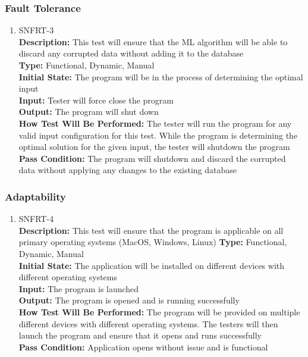\documentclass[12pt, titlepage]{article}
\begin{document}
\subsubsection{Fault Tolerance}
\begin{enumerate}
    \item{SNFRT-3\\}
    \textbf{Description:} This test will ensure that the ML algorithm will be able to discard any corrupted data without adding it to the database\\
    \textbf{Type:} Functional, Dynamic, Manual\\
    \textbf{Initial State:} The program will be in the process of determining the optimal input\\
    \textbf{Input:} Tester will force close the program\\
    \textbf{Output:} The program will shut down\\
    \textbf{How Test Will Be Performed:} The tester will run the program for any valid input configuration for this test. While the program is determining the optimal solution for the given input, the tester will shutdown the program\\
    \textbf{Pass Condition:} The program will shutdown and discard the corrupted data without applying any changes to the existing database\\
\end{enumerate}

\subsubsection{Adaptability}
\begin{enumerate}
    \item{SNFRT-4\\}
    \textbf{Description:} This test will ensure that the program is applicable on all primary operating systems (MacOS, Windows, Linux)
    \textbf{Type:} Functional, Dynamic, Manual\\
    \textbf{Initial State:} The application will be installed on different devices with different operating systems\\
    \textbf{Input:} The program is launched\\
    \textbf{Output:} The program is opened and is running successfully\\
    \textbf{How Test Will Be Performed:} The program will be provided on multiple different devices with different operating systems. The testers will then launch the program and ensure that it opens and runs successfully\\
    \textbf{Pass Condition:} Application opens without issue and is functional\\
\end{enumerate}
\end{document}
